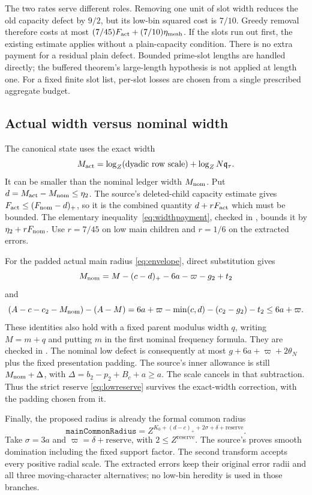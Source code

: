 The two rates serve different roles. Removing one unit of slot width
reduces the old capacity defect by $9/2$, but its low-bin squared cost is
$7/10$. Greedy removal therefore costs at most
$(7/45)F_{\rm act}+(7/10)\eta_{\rm mesh}$.
If the slots run out first, the existing  estimate applies
without a plain-capacity condition. There is no extra payment for a
residual plain defect. Bounded prime-slot lengths are handled directly;
the buffered theorem's large-length hypothesis is not applied at length
one. For a fixed finite slot list, per-slot losses are chosen from a
single prescribed aggregate budget.

\subsection{Actual width versus nominal width}
The canonical state uses the exact width
\[
 M_{\rm act}=\log_Z(\text{dyadic row scale})+
             \log_Z N\mathfrak q_\tau.
\]
It can be smaller than the nominal ledger width $M_{\rm nom}$. Put
$d=M_{\rm act}-M_{\rm nom}\le\eta_2$. The source's deleted-child capacity
estimate gives $F_{\rm act}\le(F_{\rm nom}-d)_{+}$, so it is the combined
quantity $d+rF_{\rm act}$ which must be bounded. The elementary
inequality~\eqref{eq:widthpayment}, checked in
, bounds it by
$\eta_2+rF_{\rm nom}$. Use $r=7/45$ on low main children and $r=1/6$
on the extracted errors.

For the padded actual main radius \eqref{eq:envelope}, direct
substitution gives
\[
 M_{\rm nom}=M-(c-d)_+-6a-\varpi-g_2+t_2
\]
and
\[
 (A-c-c_2-M_{\rm nom})-(A-M)
 =6a+\varpi-\min(c,d)-(c_2-g_2)-t_2\le6a+\varpi.
\]
These identities also hold with a fixed parent modulus width $q$, writing
$M=m+q$ and putting $m$ in the first nominal frequency formula.
They are checked in .
The nominal low defect is consequently at most
$g+6a+\varpi+2\theta_N$ plus the fixed presentation padding. The source's
inner allowance is still $M_{\rm nom}+\Delta$, with
$\Delta=b_2-p_2+B_c+a\ge a$. The scale cancels in that subtraction.
Thus the strict reserve \eqref{eq:lowreserve} survives the exact-width
correction, with the padding chosen from it.

Finally, the proposed radius is already the formal common radius
\[
 \texttt{mainCommonRadius}
 =Z^{K_0+(d-c)_++2\sigma+\delta+\mathrm{reserve}}.
\]
Take $\sigma=3a$ and $\varpi=\delta+\mathrm{reserve}$, with
$2\le Z^{\mathrm{reserve}}$. The source's 
proves smooth domination including the fixed support factor. The second
transform accepts every positive radial scale. The extracted errors keep
their original error radii and all three moving-character alternatives;
no low-bin heredity is used in those branches.
